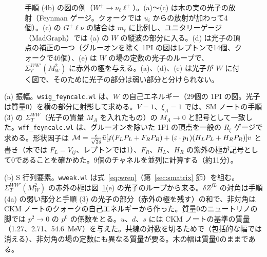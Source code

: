 \documentclass[a4paper,10pt]{ltjsarticle}
\begin{document}
\begin{figure}[tbp]
\caption{手順 (4b) の図の例（$W^+\to\nu_\ell\ell^+$）。(a)〜(c) は木の実の光子の放射（Feynman ゲージ。クォークでは $u_i$ からの放射が加わって4個）。(c) の $G^+\ell\nu$ の結合は $m_\ell$ に比例し、ユニタリーゲージ（MadGraph）では (a) の $W$ の縦波の部分に入る。(d) は光子の頂点の補正の一つ（グルーオンを除く 1PI の図はレプトンで14個、クォークで46個）、(e) は $W$ の場の定数の光子のループで、$\Sigma^{WW\prime}_T(M_W^2)$ に赤外の極を与える。(a)、(d)、(e) は光子が $W$ に付く図で、そのために光子の部分は弱い部分と分けられない。}
\label{fig:wnlo}
\end{figure}

(a) 振幅。\texttt{wsig\_feyncalc.wl} は、$W$ の自己エネルギー（29個の 1PI の図。光子は質量0）を横の部分に射影して求める。$V=1$、$\xi_A=1$ では、SM ノートの手順 (3) の $\Sigma^{WW}_T$（光子の質量 $M_A$ を入れたもの）の $M_A\to0$ と記号として一致した。\texttt{wff\_feyncalc.wl} は、グルーオンを除いた 1PI の頂点を一般の $R_\xi$ ゲージで求める。形状因子は $\mathcal M=\frac{e}{\sqrt2\hat s}\bar u[\slashed\varepsilon(F_LP_L+F_RP_R)+(\varepsilon\cdot p_1)(H_LP_L+H_RP_R)]v$ と書き（木では $F_L=V_{ij}$、レプトンでは1）、$F_R$、$H_L$、$H_R$ の紫外の極が記号として0であることを確かめた。9個のチャネルを並列に計算する（約11分）。

(b) S 行列要素。\texttt{wweak.wl} は式~\eqref{eq:wren}（第~\ref{sec:smatrix} 節）を組む。$\Sigma^{WW\prime}_T(M_W^2)$ の赤外の極は図~\ref{fig:wnlo}(e) の光子のループから来る。$\delta Z^{fL}$ の対角は手順 (4a) の弱い部分と手順 (3) の光子の部分（赤外の極を残す）の和で、非対角は CKM ノートのクォークの自己エネルギーから作った。質量0のニュートリノの脚では $p^2\to0$ の $p^0$ の係数をとる。$u$、$d$、$s$ には CKM ノートの基準の質量（1.27、2.71、54.6~MeV）を与えた。共線の対数を切るためで（包括的な幅では消える）、非対角の場の定数にも異なる質量が要る。木の幅は質量0のままである。
\end{document}
